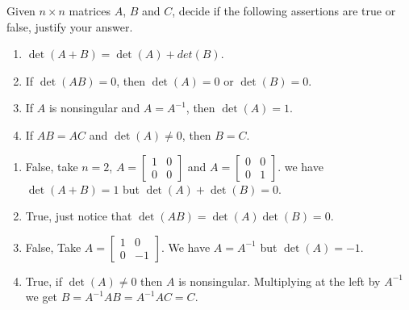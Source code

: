 \documentclass[12pt,a4paper]{article}
\theoremstyle{definition}
\begin{document}
\begin{question}
Given  $n\times n$ matrices $A$, $B$ and $C$, decide if the following assertions are true or false, justify your answer. 
\begin{enumerate}
    \item $\det(A+B)=\det(A)+det(B)$.
    \item If $\det(AB)=0$, then $\det(A)=0$ or $\det(B)=0$.
    \item If $A$ is nonsingular and $A=A^{-1}$, then $\det(A)=1$.
    \item If $AB=AC$ and $\det(A)\neq 0$, then $B=C$.
\end{enumerate}
\end{question}

\begin{solution}
\begin{enumerate}
    \item False, take $n=2$, $A=\begin{bmatrix} 1 & 0 \\ 0 & 0\end{bmatrix}$ and $A=\begin{bmatrix} 0 & 0 \\ 0 & 1\end{bmatrix}$. we have $\det(A+B)=1$ but $\det(A)+\det(B)=0$.
    \item True, just notice that $\det(AB)=\det(A)\det(B)=0$. 
    \item False, Take $A=\begin{bmatrix} 1 & 0 \\ 0 & -1\end{bmatrix}$. We have $A=A^{-1}$ but $\det(A)=-1$.
    \item True, if $\det(A)\neq 0$ then $A$ is nonsingular. Multiplying at the left by $A^{-1}$ we get $B=A^{-1}AB=A^{-1}AC=C$.
\end{enumerate}
\end{solution}
\end{document}
